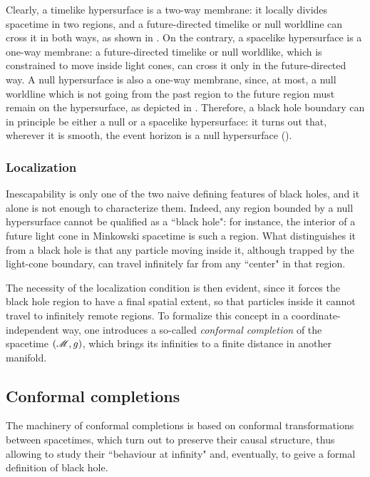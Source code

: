 Clearly, a timelike hypersurface is a two-way membrane: it locally divides spacetime in two regions, and a future-directed timelike or null worldline can cross it in both ways, as shown in . On the contrary, a spacelike hypersurface is a one-way membrane: a future-directed timelike or null worldlike, which is constrained to move inside light cones, can cross it only in the future-directed way. A null hypersurface is also a one-way membrane, since, at most, a null worldline which is not going from the past region to the future region must remain on the hypersurface, as depicted in . Therefore, a black hole boundary can in principle be either a null or a spacelike hypersurface: it turns out that, wherever it is smooth, the event horizon is a null hypersurface ().

\subsubsection{Localization}

Inescapability is only one of the two naive defining features of black holes, and it alone is not enough to characterize them. Indeed, any region bounded by a null hypersurface cannot be qualified as a ``black hole": for instance, the interior of a future light cone in Minkowski spacetime is such a region. What distinguishes it from a black hole is that any particle moving inside it, although trapped by the light-cone boundary, can travel infinitely far from any ``center" in that region.

The necessity of the localization condition is then evident, since it forces the black hole region to have a final spatial extent, so that particles inside it cannot travel to infinitely remote regions. To formalize this concept in a coordinate-independent way, one introduces a so-called \emph{conformal completion} of the spacetime $ (\mathscr{M} , g) $, which brings its infinities to a finite distance in another manifold.

\subsection{Conformal completions}

The machinery of conformal completions is based on conformal transformations between spacetimes, which turn out to preserve their causal structure, thus allowing to study their ``behaviour at infinity" and, eventually, to geive a formal definition of black hole.

